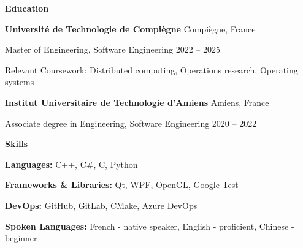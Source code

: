 \documentclass[11pt]{article}
\begin{document}
\begin{center}
    \textbf{Education}
\end{center}
\textbf{Université de Technologie de Compiègne} \hfill Compiègne, France

Master of Engineering, Software Engineering \hfill 2022 – 2025

Relevant Coursework: Distributed computing, Operations research, Operating systems 

\vspace{6pt}

\textbf{Institut Universitaire de Technologie d'Amiens } \hfill Amiens, France

Associate degree in Engineering, Software Engineering \hfill 2020 – 2022

\begin{center}
    \textbf{Skills}
\end{center}

\textbf{Languages:} C++, C\#, C, Python

\textbf{Frameworks \& Libraries:} Qt, WPF, OpenGL, Google Test

\textbf{DevOps:} GitHub, GitLab, CMake,  Azure DevOps

\textbf{Spoken Languages:} French - native speaker, English - proficient, Chinese - beginner 
\end{document}
